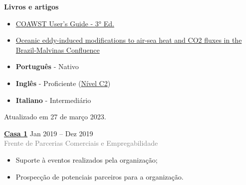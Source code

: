 \documentclass[9pt]{developercv} %
\begin{document}
\begin{minipage}[t]{0.3\textwidth}
	\vspace{-\baselineskip} %
	
	
	\textbf{Livros e artigos} %
	 \begin{itemize}
		\itemsep-0.3em
		\item \textcolor{bleu_cite}{\href{http://mtc-m21c.sid.inpe.br/col/sid.inpe.br/mtc-m21c/2020/10.02.15.11/doc/publicacao.pdf}{COAWST User's Guide - 3° Ed.}}
		\item \textcolor{bleu_cite}{\href{https://www.nature.com/articles/s41598-021-89985-9}{Oceanic eddy-induced modifications to air-sea heat and CO2 fluxes in the Brazil-Malvinas Confluence}}
	 \end{itemize}  
\end{minipage}
\hfill
\begin{minipage}[t]{0.3\textwidth}
	\vspace{-\baselineskip} %

	\vspace{-0.3cm}
	\begin{itemize}
	\itemsep0em
	\item \textbf{Português} - Nativo
	\item \textbf{Inglês} - Proficiente (\href{https://www.efset.org/cert/PrWqbW}{\textcolor{bleu_cite}{Nível C2}})
	\item \textbf{Italiano} - Intermediário 
	\end{itemize}
	\vspace{0.8cm}
	
	\centering\footnotesize Atualizado em 27 de março 2023.
\end{minipage}
\hfill
\begin{minipage}[t]{0.3\textwidth}
	\vspace{-\baselineskip} %


	\textbf{\textcolor{bleu_cite}{\href{https://www.casaum.org/}{Casa 1}} } \hspace{1.cm} Jan 2019 --  Dez 2019\\
	\textcolor{gray}{Frente de Parcerias Comerciais e Empregabilidade}
	\begin{itemize}
		\item Suporte à eventos realizados pela organização;
		\item Prospecção de potenciais parceiros para a organização.
	\end{itemize}
\end{minipage}


\end{document}
